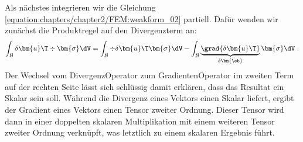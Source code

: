 \documentclass[letterpaper,10pt,german]{jupyterBook}
\begin{document}
\sphinxAtStartPar
Als nächstes integrieren wir die Gleichung \eqref{equation:chapters/chapter2/FEM:weakform_02} partiell. Dafür wenden wir zunächst die Produktregel auf den Divergenzterm an:
\begin{equation}\label{equation:chapters/chapter2/FEM:divergenzsatz}
\begin{split}\int_{\mathcal{B}} \delta \bm{u}\T \div{\bm{\sigma}} \dV = \int_{\mathcal{B}} \div{\delta \bm{u}\T \bm{\sigma}} \dV -\int_{\mathcal{B}} \underbrace{\grad{\delta\bm{u}\T}}_{\delta \bm{\eb}}\bm{\sigma} \dV \; . \end{split}
\end{equation}
\sphinxAtStartPar
Der Wechsel vom Divergenz\sphinxhyphen{}Operator zum Gradienten\sphinxhyphen{}Operator im zweiten Term auf der rechten Seite lässt sich schlüssig damit erklären, dass das Resultat ein Skalar sein soll. Während die Divergenz eines Vektors einen Skalar liefert, ergibt der Gradient eines Vektors einen Tensor zweiter Ordnung. Dieser Tensor wird dann in einer doppelten skalaren Multiplikation mit einem weiteren Tensor zweiter Ordnung verknüpft, was letztlich zu einem skalaren Ergebnis führt.
\end{document}
